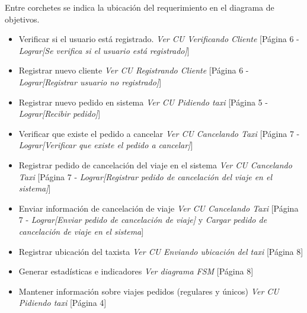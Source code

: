 \documentclass[a4paper]{article}
\begin{document}
Entre corchetes se indica la ubicaci\'on del requerimiento en el diagrama de objetivos. 
\begin{itemize}
\item Verificar si el usuario est\'a registrado. \textit{Ver CU Verificando Cliente} [P\'agina 6 - \textit{Lograr[Se verifica si el usuario est\'a registrado]}]
\item Registrar nuevo cliente \textit{Ver CU Registrando Cliente} [P\'agina 6 - \textit{Lograr[Registrar usuario no registrado]}]
\item Registrar nuevo pedido en sistema \textit{Ver CU Pidiendo taxi} [P\'agina 5 - \textit{Lograr[Recibir pedido]}]
\item Verificar que existe el pedido a cancelar \textit{Ver CU Cancelando Taxi} [P\'agina 7 - \textit{Lograr[Verificar que existe el pedido a cancelar]}]
\item Registrar pedido de cancelaci\'on del viaje en el sistema \textit{Ver CU Cancelando Taxi} [P\'agina 7 - \textit{Lograr[Registrar pedido de cancelaci\'on del viaje en el sistema]}]
\item Enviar informaci\'on de cancelaci\'on de viaje \textit{Ver CU Cancelando Taxi} [P\'agina 7 - \textit{Lograr[Enviar pedido de cancelaci\'on de viaje]} y \textit{Cargar pedido de cancelaci\'on de viaje en el sistema}]
\item Registrar ubicaci\'on del taxista \textit{Ver CU Enviando ubicaci\'on del taxi} [P\'agina 8]
\item Generar estad\'isticas e indicadores \textit{Ver diagrama FSM} [P\'agina 8]
\item Mantener informaci\'on sobre viajes pedidos (regulares  y \'unicos) \textit{Ver CU Pidiendo taxi} [P\'agina 4]


\end{itemize}
\end{document}

